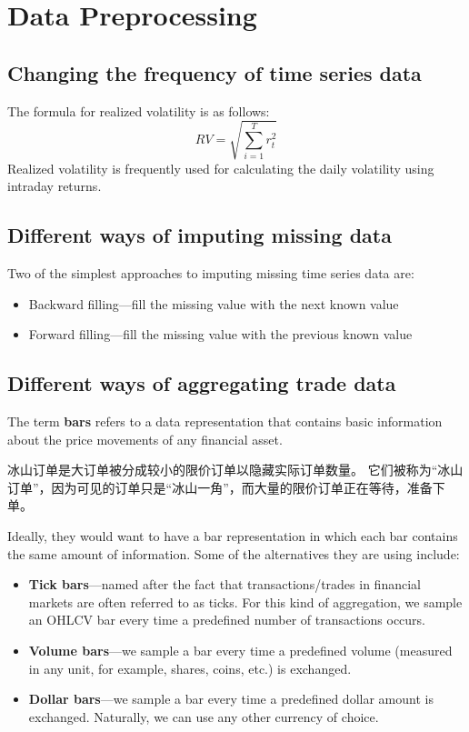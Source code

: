 \chapter{Data Preprocessing\label{ch02}}
\section{Changing the frequency of time series data}
The formula for realized volatility is as follows:
\begin{equation}
    RV=\sqrt{\sum_{i=1}^{T}r_t^2}
\end{equation}
Realized volatility is frequently used for calculating the daily volatility using intraday returns.
\section{Different ways of imputing missing data}
Two of the simplest approaches to imputing missing time series data are:
\begin{itemize}
    \item Backward filling—fill the missing value with the next known value
    \item Forward filling—fill the missing value with the previous known value
\end{itemize}
\section{Different ways of aggregating trade data}
The term \textbf{bars} refers to a data representation that contains basic information about the price movements of any financial asset.

冰山订单是大订单被分成较小的限价订单以隐藏实际订单数量。 它们被称为“冰山订单”，因为可见的订单只是“冰山一角”，而大量的限价订单正在等待，准备下单。

Ideally, they would want to have a bar representation in which each bar contains the same amount of information. Some of the alternatives they are using include:
\begin{itemize}
    \item \textbf{Tick bars}—named after the fact that transactions/trades in financial markets are often referred to as ticks. For this kind of aggregation, we sample an OHLCV bar every time a predefined number of transactions occurs.
    \item \textbf{Volume bars}—we sample a bar every time a predefined volume (measured in any unit, for example, shares, coins, etc.) is exchanged.
    \item \textbf{Dollar bars}—we sample a bar every time a predefined dollar amount is exchanged. Naturally, we can use any other currency of choice.
\end{itemize}

